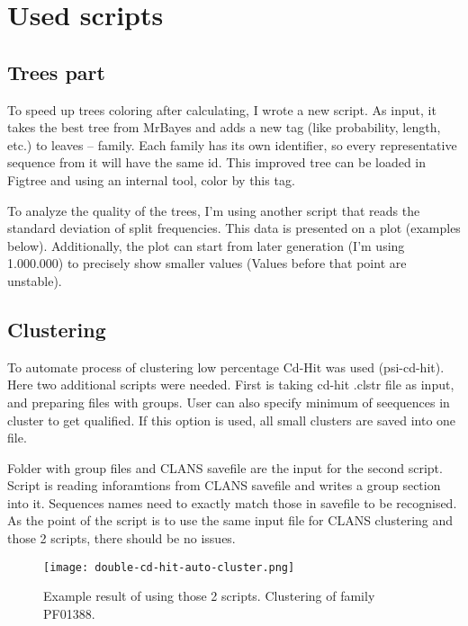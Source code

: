         \section{Used scripts}

\subsection{Trees part}
To speed up trees coloring after calculating, I wrote a new script.
As input, it takes the best tree from MrBayes and adds a new tag (like probability, length, etc.) to leaves -- family.
Each family has its own identifier, so every representative sequence from it will have the same id.
This improved tree can be loaded in Figtree and using an internal tool, color by this tag.


To analyze the quality of the trees, I'm using another script that reads the standard deviation of split frequencies.
This data is presented on a plot (examples below).
Additionally, the plot can start from later generation (I'm using 1.000.000) to precisely show smaller values (Values before that point are unstable).

\subsection{Clustering}
To automate process of clustering low percentage Cd-Hit was used (psi-cd-hit).
Here two additional scripts were needed.
First is taking cd-hit .clstr file as input, and preparing files with groups.
User can also specify minimum of seequences in cluster to get qualified.
If this option is used, all small clusters are saved into one file.


Folder with group files and CLANS savefile are the input for the second script.
Script is reading inforamtions from CLANS savefile and writes a group section into it.
Sequences names need to exactly match those in savefile to be recognised.
As the point of the script is to use the same input file for CLANS clustering and those 2 scripts, there should be no issues.

\begin{figure}[H]
\texttt{[image: double-cd-hit-auto-cluster.png]}
\caption{Example result of using those 2 scripts. Clustering of family PF01388.}
\end{figure}

